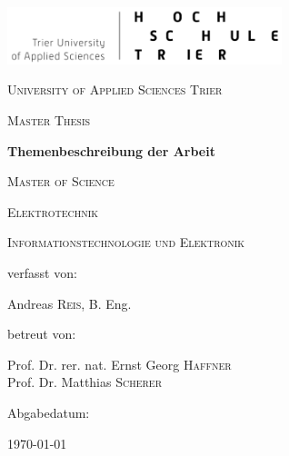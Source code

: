\begin{titlepage}
{\centering
\includegraphics[width=0.6\textwidth]{HS_Logo2}\par
\vspace{1cm}
{\scshape\LARGE University of Applied Sciences Trier \par}
\vspace{1.5cm}
{\scshape\Large Master Thesis \par}
\vspace{1.5cm}
{\huge\bfseries Themenbeschreibung der Arbeit \par}
\vspace{1.5cm}
{\scshape \large Master of Science \par}
\vspace{0.8cm}
{\scshape\large Elektrotechnik\par}
{\scshape\large Informationstechnologie und Elektronik  \par}
\vspace{1.5cm}
{verfasst von: \\  \par}
{\large  Andreas  \textsc{Reis}, B. Eng.\\  \par}
 \vspace{0.5cm}
betreut von: \par
{\large Prof. Dr. rer. nat. Ernst Georg \textsc{Haffner} \\  Prof. Dr. Matthias \textsc{Scherer} \par}
\vspace{0.5cm}
{Abgabedatum: \\  \par}
{\large \today \par}} %
\end{titlepage}

\cleardoublepage